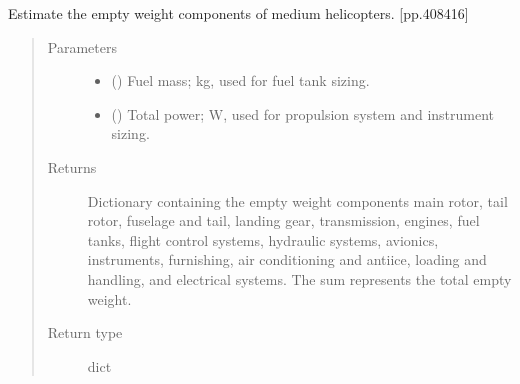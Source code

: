 \documentclass[letterpaper,10pt,english]{sphinxmanual}
\begin{document}
\begin{fulllineitems}
\begin{fulllineitems}
\begin{quote}
\begin{description}
\end{description}\end{quote}

\end{fulllineitems}


\begin{fulllineitems}
\label{\detokenize{modules/helicopter:helicopter.Helicopter.empty_weight_estimation}}
\sphinxAtStartPar
Estimate the empty weight components of medium helicopters.
{[}pp.408\sphinxhyphen{}416{]}
\begin{quote}\begin{description}
\item[{Parameters}] \leavevmode\begin{itemize}
\item {} 
\sphinxAtStartPar
{} () \textendash{} Fuel mass; kg, used for fuel tank sizing.

\item {} 
\sphinxAtStartPar
{} () \textendash{} Total power; W, used for propulsion system and instrument sizing.

\end{itemize}

\item[{Returns}] \leavevmode
\sphinxAtStartPar
Dictionary containing the empty weight components main rotor, tail
rotor, fuselage and tail, landing gear, transmission, engines, fuel
tanks, flight control systems, hydraulic systems, avionics,
instruments, furnishing, air conditioning and anti\sphinxhyphen{}ice, loading and
handling, and electrical systems. The sum represents the total
empty weight.

\item[{Return type}] \leavevmode
\sphinxAtStartPar
dict

\end{description}\end{quote}

\end{fulllineitems}


\end{fulllineitems}
\end{document}
